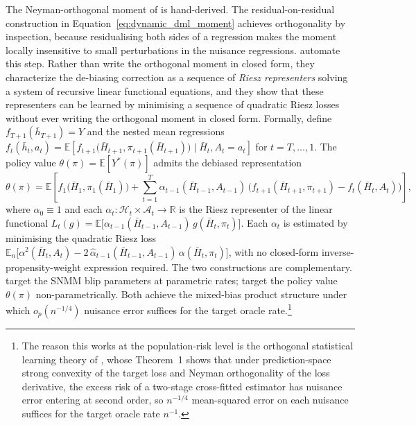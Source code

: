 The Neyman-orthogonal moment of \citet{lewisSyrgkanis2021dynamicDML} is hand-derived. The residual-on-residual construction in Equation~\eqref{eq:dynamic_dml_moment} achieves orthogonality by inspection, because residualising both sides of a regression makes the moment locally insensitive to small perturbations in the nuisance regressions. \citet{chernozhukov2023automatic} automate this step. Rather than write the orthogonal moment in closed form, they characterize the de-biasing correction as a sequence of \emph{Riesz representers} solving a system of recursive linear functional equations, and they show that these representers can be learned by minimising a sequence of quadratic Riesz losses without ever writing the orthogonal moment in closed form. Formally, define $f_{T+1}(\bar h_{T+1}) = Y$ and the nested mean regressions $f_t(\bar h_t, a_t) = \mathbb{E}\!\left[f_{t+1}\bigl(\bar H_{t+1}, \pi_{t+1}(\bar H_{t+1})\bigr) \mid \bar H_t, A_t = a_t\right]$ for $t = T, \ldots, 1$. The policy value $\theta(\pi) = \mathbb{E}[Y^*(\pi)]$ admits the debiased representation
\begin{equation}
\theta(\pi) = \mathbb{E}\!\left[f_1\bigl(\bar H_1, \pi_1(\bar H_1)\bigr) + \sum_{t=1}^{T} \alpha_{t-1}(\bar H_{t-1}, A_{t-1})\,\bigl(f_{t+1}(\bar H_{t+1}, \pi_{t+1}) - f_t(\bar H_t, A_t)\bigr)\right],
\label{eq:cnss_riesz}
\end{equation}
where $\alpha_0 \equiv 1$ and each $\alpha_t : \mathcal{H}_t \times \mathcal{A}_t \to \mathbb{R}$ is the Riesz representer of the linear functional $L_t(g) = \mathbb{E}\bigl[\alpha_{t-1}(\bar H_{t-1}, A_{t-1})\,g(\bar H_t, \pi_t)\bigr]$. Each $\alpha_t$ is estimated by minimising the quadratic Riesz loss $\mathbb{E}_n\bigl[\alpha^2(\bar H_t, A_t) - 2\,\hat\alpha_{t-1}(\bar H_{t-1}, A_{t-1})\,\alpha(\bar H_t, \pi_t)\bigr]$, with no closed-form inverse-propensity-weight expression required. The two constructions are complementary. \citet{lewisSyrgkanis2021dynamicDML} target the SNMM blip parameters at parametric rates; \citet{chernozhukov2023automatic} target the policy value $\theta(\pi)$ non-parametrically. Both achieve the mixed-bias product structure under which $o_p(n^{-1/4})$ nuisance error suffices for the target oracle rate.\footnote{The reason this works at the population-risk level is the orthogonal statistical learning theory of \citet{fosterSyrgkanis2023orthogonal}, whose Theorem~1 shows that under prediction-space strong convexity of the target loss and Neyman orthogonality of the loss derivative, the excess risk of a two-stage cross-fitted estimator has nuisance error entering at second order, so $n^{-1/4}$ mean-squared error on each nuisance suffices for the target oracle rate $n^{-1}$.}

